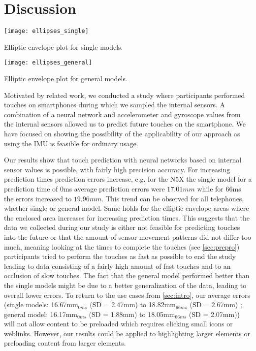 \section{Discussion}
\begin{marginfigure}
	\vspace{-8cm}	
	\centering
	\texttt{[image: ellipses\_single]}
	\caption{Elliptic envelope plot for single models.\newline}
	\label{fig:ell_single}
\end{marginfigure}
\begin{marginfigure}
	\texttt{[image: ellipses\_general]}
	\caption{Elliptic envelope plot for general models.}
	\label{fig:ell_general}
\end{marginfigure}
Motivated by related work, we conducted a study where participants performed touches on smartphones during which we sampled the internal sensors. 
A combination of a neural network and accelerometer and gyroscope values from the internal sensors allowed us to predict future touches on the smartphone. 
We have focused on showing the possibility of the applicability of our approach as using the IMU is feasible for ordinary usage.

Our results show that touch prediction with neural networks based on internal sensor values is possible, with fairly high precision accuracy.
For increasing prediction times prediction errors increase, e.g. for the N5X the single model for a prediction time of 0ms average prediction errors were $ 17.01mm $ while for 66ms the errors increased to $ 19.96mm $.
This trend can be observed for all telephones, whether single or general model.
Same holds for the elliptic envelope areas where the enclosed area increases for increasing prediction times.
This suggests that the data we collected during our study is either not feasible for predicting touches into the future or that the amount of sensor movement patterns did not differ too much, meaning looking at the times to complete the touches (see \cref{sec:prepro}) participants tried to perform the touches as fast as possible to end the study leading to data consisting of a fairly high amount of fast touches and to an occlusion of slow touches. 
The fact that the general model performed better than the single models might be due to a better generalization of the data, leading to overall lower errors.
To return to the use cases from \cref{sec:intro}, our average errors (single models: 16.67mm$_{0ms}$ (SD = 2.47mm) to 18.82mm$_{66ms}$ (SD = 2.67mm) ; general model: 16.17mm$_{0ms}$ (SD = 1.88mm) to 18.05mm$_{66ms}$ (SD = 2.07mm)) will not allow content to be preloaded which requires clicking small icons or weblinks. 
However, our results could be applied to highlighting larger elements or preloading content from larger elements.

